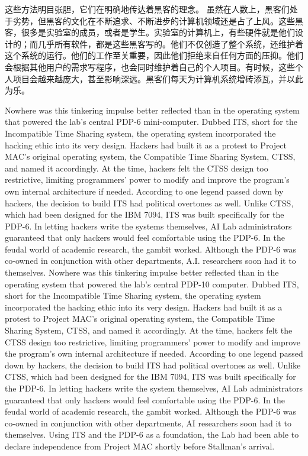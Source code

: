 \ifdefined\chs
\ifdefined\vone
这些方法明目张胆，它们在明确地传达着黑客的理念。
\fi
虽然在人数上，黑客们处于劣势，但黑客的文化在不断追求、不断进步的计算机领域还是占了上风。这些黑客，很多是实验室的成员，或者是学生。实验室的计算机上，有些硬件就是他们设计的；而几乎所有软件，都是这些黑客写的。他们不仅创造了整个系统，还维护着这个系统的运行。他们的工作至关重要，因此他们拒绝来自任何方面的压抑。他们会根据其他用户的需求写程序，也会同时维护着自己的个人项目。有时候，这些个人项目会越来越庞大，甚至影响深远。黑客们每天为计算机系统增砖添瓦，并以此为乐。
\fi

\ifdefined\eng
\ifdefined\vone
Nowhere was this tinkering impulse better reflected than in the operating system that powered the lab's central PDP-6 mini-computer. Dubbed ITS, short for the Incompatible Time Sharing system, the operating system incorporated the hacking ethic into its very design. Hackers had built it as a protest to Project MAC's original operating system, the Compatible Time Sharing System, CTSS, and named it accordingly. At the time, hackers felt the CTSS design too restrictive, limiting programmers' power to modify and improve the program's own internal architecture if needed. According to one legend passed down by hackers, the decision to build ITS had political overtones as well. Unlike CTSS, which had been designed for the IBM 7094, ITS was built specifically for the PDP-6. In letting hackers write the systems themselves, AI Lab administrators guaranteed that only hackers would feel comfortable using the PDP-6. In the feudal world of academic research, the gambit worked. Although the PDP-6 was co-owned in conjunction with other departments, A.I. researchers soon had it to themselves.
\fi
\ifdefined\vtwo
Nowhere was this tinkering impulse better reflected than in the operating system that powered the lab's central PDP-10 computer. Dubbed ITS, short for the Incompatible Time Sharing system, the operating system incorporated the hacking ethic into its very design. Hackers had built it as a protest to Project MAC's original operating system, the Compatible Time Sharing System, CTSS, and named it accordingly. At the time, hackers felt the CTSS design too restrictive, limiting programmers' power to modify and improve the program's own internal architecture if needed. According to one legend passed down by hackers, the decision to build ITS had political overtones as well. Unlike CTSS, which had been designed for the IBM 7094, ITS was built specifically for the PDP-6. In letting hackers write the system themselves, AI Lab administrators guaranteed that only hackers would feel comfortable using the PDP-6. In the feudal world of academic research, the gambit worked. Although the PDP-6 was co-owned in conjunction with other departments, AI researchers soon had it to themselves.  Using ITS and the PDP-6 as a foundation, the Lab had been able to declare independence from Project MAC shortly before Stallman's arrival.
\fi
\fi

